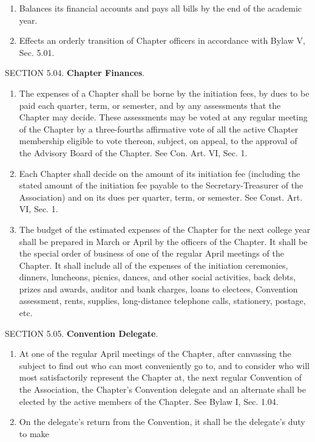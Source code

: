 \begin{optionalpart}
\begin{enumerate}
\begin{enumerate}
and the academic regulations of the host institution. 
\item Balances its financial accounts and 
pays all bills by the end of the academic year. 
\item Effects an orderly transition of Chapter 
officers in accordance with Bylaw V, Sec. 5.01. 
\end{enumerate}
\end{enumerate}
SECTION 5.04. {\bf Chapter Finances}.
\begin{enumerate}
\item The expenses of a Chapter shall be borne by the 
initiation fees, by dues to be paid each quarter, term, or semester, and by any assessments that the 
Chapter may decide. These assessments may be voted at any regular meeting of the Chapter by a 
three-fourths affirmative vote of all the active Chapter membership eligible to vote thereon, subject, 
on appeal, to the approval of the Advisory Board of the Chapter. See Con. Art. VI, Sec. 1.
\item Each Chapter shall decide on the amount of its initiation fee (including the stated 
amount of the initiation fee payable to the Secretary-Treasurer of the Association) and on 
its dues per quarter, term, or semester. See Const. Art. VI, Sec. 1.
\item The budget of the estimated expenses of the Chapter for the next college year shall 
be prepared in March or April by the officers of the Chapter. It shall be the special order 
of business of one of the regular April meetings of the Chapter. It shall include all of the 
expenses of the initiation ceremonies, dinners, luncheons, picnics, dances, and other social 
activities, back debts, prizes and awards, auditor and bank charges, loans to electees, Convention assessment, rents, supplies, long-distance telephone calls, stationery, postage, etc.
\end{enumerate}
SECTION 5.05. {\bf Convention Delegate}.
\begin{enumerate}
\item At one of the regular April meetings of the 
Chapter, after canvassing the subject to find out who can most conveniently go to, and to 
consider who will most satisfactorily represent the Chapter at, the next regular Convention 
of the Association, the Chapter's Convention delegate and an alternate shall be elected by 
the active members of the Chapter. See Bylaw I, Sec. 1.04.
\item On the delegate's return from the Convention, it shall be the delegate's duty to make 

\end{enumerate}
\end{optionalpart}
